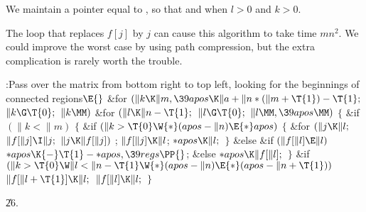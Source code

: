 We maintain a pointer  equal to ,
so that
 and  when $l>0$ and $k>0$.

The loop that replaces $f[j]$ by $j$ can cause this algorithm to
take time $mn^2$. We could improve the worst case by using path
compression, but the extra complication is rarely worth the trouble.

\Y\B\4:Pass over the  matrix from bottom right to top left, looking
for the beginnings of connected regions\X${}\E{}$\6
\&{for} ${}(\|k\K\|m,\39\\{apos}\K\|a+\|n*(\|m+\T{1})-\T{1};{}$ ${}\|k\G%
\T{0};{}$ ${}\|k\MM){}$\1\6
\&{for} ${}(\|l\K\|n-\T{1};{}$ ${}\|l\G\T{0};{}$ ${}\|l\MM,\39\\{apos}\MM){}$\5
${}\{{}$\1\6
\&{if} ${}(\|k<\|m){}$\5
${}\{{}$\1\6
\&{if} ${}(\|k>\T{0}\W{*}(\\{apos}-\|n)\E{*}\\{apos}){}$\5
${}\{{}$\1\6
\&{for} ${}(\|j\K\|l;{}$ ${}\|f[\|j]\I\|j;{}$ ${}\|j\K\|f[\|j]){}$\1\5
;\2\6
${}\|f[\|j]\K\|l{}$;\6
${}{*}\\{apos}\K\|l;{}$\6
\4${}\}{}$\5
\2\&{else} \&{if} ${}(\|f[\|l]\E\|l){}$\1\5
${}{*}\\{apos}\K{-}\T{1}-{*}\\{apos},\39\\{regs}\PP{}$;\2%
\6
\&{else}\1\5
${}{*}\\{apos}\K\|f[\|l];{}$\2\6
\4${}\}{}$\2\6
\&{if} ${}(\|k>\T{0}\W\|l<\|n-\T{1}\W{*}(\\{apos}-\|n)\E{*}(\\{apos}-\|n+%
\T{1})){}$\1\5
${}\|f[\|l+\T{1}]\K\|l;{}$\2\6
${}\|f[\|l]\K\|l;{}$\6
\4${}\}{}$\2\2\par
\U26.\fi


